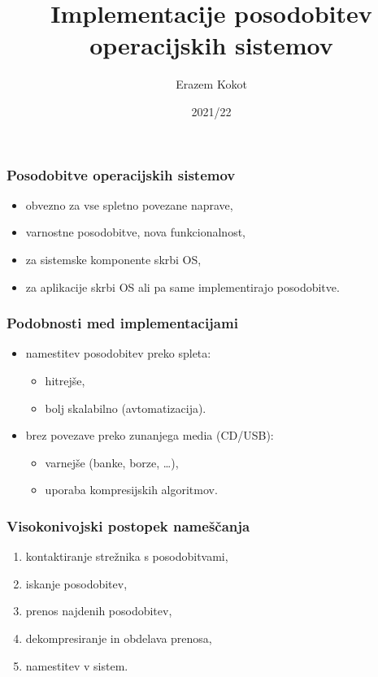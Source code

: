 \documentclass[aspectratio=169]{beamer}
\title{Implementacije posodobitev operacijskih sistemov}
\author{Erazem Kokot}
\institute[FRI]{Sistemska programska oprema,\\Fakulteta za računalništvo in informatiko}
\date{2021/22}
\begin{document}
    \begin{frame}
    \titlepage{}
    \end{frame}

    \begin{frame}
        \frametitle{Posodobitve operacijskih sistemov}
        \begin{itemize}
            \item obvezno za vse spletno povezane naprave,
            \item varnostne posodobitve, nova funkcionalnost,
            \item za sistemske komponente skrbi OS,
            \item za aplikacije skrbi OS ali pa same implementirajo posodobitve.
        \end{itemize}
    \end{frame}

    \begin{frame}
        \frametitle{Podobnosti med implementacijami}
        \begin{itemize}
            \item namestitev posodobitev preko spleta:
            \begin{itemize}
                \item hitrejše,
                \item bolj skalabilno (avtomatizacija).
            \end{itemize}
            \item brez povezave preko zunanjega media (CD/USB):
            \begin{itemize}
                \item varnejše (banke, borze, \ldots),
                \item uporaba kompresijskih algoritmov.
            \end{itemize}
        \end{itemize}
    \end{frame}

    \begin{frame}
        \frametitle{Visokonivojski postopek nameščanja}
        \begin{enumerate}
            \item kontaktiranje strežnika s posodobitvami,
            \item iskanje posodobitev,
            \item prenos najdenih posodobitev,
            \item dekompresiranje in obdelava prenosa,
            \item namestitev v sistem.
        \end{enumerate}
    \end{frame}
\end{document}
